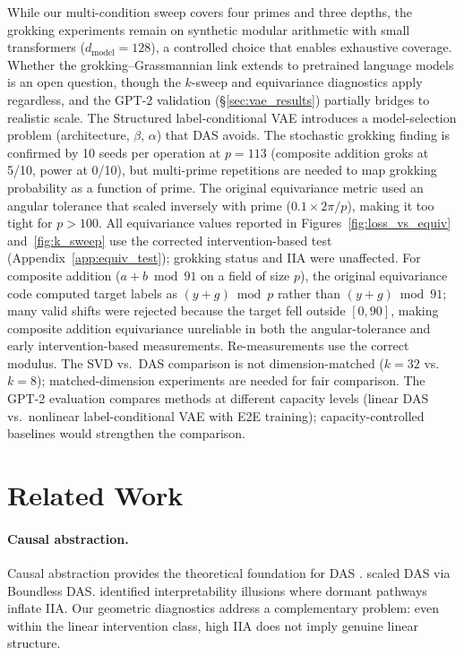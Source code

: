 \documentclass{article}
\begin{document}
While our multi-condition sweep covers four primes and three depths, the
grokking experiments remain on synthetic modular arithmetic with small
transformers ($d_\text{model} = 128$), a controlled choice that enables
exhaustive coverage. Whether the grokking--Grassmannian link extends to
pretrained language models is an open question, though the $k$-sweep and
equivariance diagnostics apply regardless, and the GPT-2 validation
(\S\ref{sec:vae_results}) partially bridges to realistic scale. The Structured
label-conditional VAE introduces a model-selection problem (architecture, $\beta$, $\alpha$)
that DAS avoids. The stochastic grokking finding is confirmed by 10 seeds per operation
at $p{=}113$ (composite addition groks at 5/10, power at 0/10), but
multi-prime repetitions are needed to map grokking probability as a function
of prime. The original equivariance metric used an angular
tolerance that scaled inversely with prime ($0.1 \times 2\pi/p$), making it
too tight for $p > 100$. All equivariance values reported in Figures~\ref{fig:loss_vs_equiv}
and~\ref{fig:k_sweep} use the corrected intervention-based test
(Appendix~\ref{app:equiv_test}); grokking status and IIA were unaffected.
For composite addition ($a + b \bmod 91$ on a field of size $p$), the
original equivariance code computed target labels as
$(y + g) \bmod p$ rather than $(y + g) \bmod 91$; many valid shifts were
rejected because the target fell outside $[0, 90]$, making composite
addition equivariance unreliable in both the angular-tolerance and early
intervention-based measurements. Re-measurements use the correct modulus. The SVD vs.\ DAS comparison is not
dimension-matched ($k = 32$ vs.\ $k = 8$); matched-dimension experiments
are needed for fair comparison. The GPT-2 evaluation compares methods at
different capacity levels (linear DAS vs.\ nonlinear label-conditional VAE with E2E
training); capacity-controlled baselines would strengthen the comparison.


\section{Related Work}
\label{sec:related}

\paragraph{Causal abstraction.}
Causal abstraction provides the theoretical foundation for DAS
\citep{geiger2021causal, geiger2023finding}. \citet{wu2024interpretability}
scaled DAS via Boundless DAS. \citet{makelov2024illusion} identified
interpretability illusions where dormant pathways inflate IIA. Our geometric
diagnostics address a complementary problem: even within the linear intervention
class, high IIA does not imply genuine linear structure.
\end{document}
